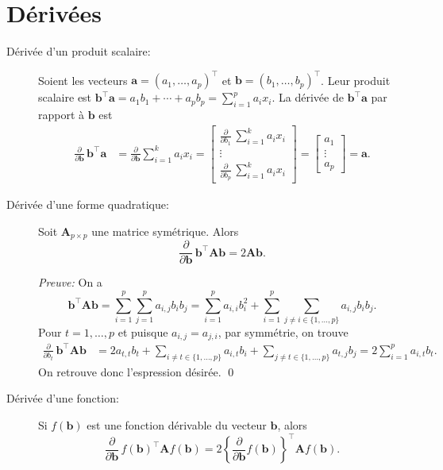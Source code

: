 \section{Dérivées}
\label{sec:elements:derivees}

\begin{description}
\item[Dérivée d'un produit scalaire:] Soient les vecteurs $\mathbf{a} = (a_1, \ldots, a_p)^\top$ et $\mathbf{b} = (b_1, \ldots, b_p)^\top$. Leur produit scalaire est $\mathbf{b^\top a} = a_1 b_1 + \cdots + a_p b_p = \sum_{i=1}^p a_i x_i$. La dérivée de $\mathbf{b^\top a}$ par rapport à $\mathbf{b}$ est
 \begin{align*}
    \frac{\partial}{\partial \mathbf{b}}\, \mathbf{b^\top a}
    &= \frac{\partial}{\partial \mathbf{b}}\sum_{i=1}^k a_i x_i 
    =
    \begin{bmatrix}
      \frac{\partial}{\partial b_1}\, \sum_{i=1}^k a_i x_i \\
      \vdots \\
      \frac{\partial}{\partial b_p}\, \sum_{i=1}^k a_i x_i
    \end{bmatrix} 
    =
    \begin{bmatrix}
      a_1 \\
      \vdots \\
      a_p
    \end{bmatrix} 
    = \mathbf{a}.
  \end{align*}

\item [Dérivée d'une forme quadratique:]  Soit $\mathbf{A}_{p \times p}$ une matrice symétrique. Alors
$$ 
 \frac{\partial}{\partial \mathbf{b}}\, \mathbf{b^\top A b} = 2 \mathbf{A b}.
$$

\emph{Preuve:}  On a
$$
\mathbf{b^\top A b}  = \sum_{i=1}^p \sum_{j=1}^p a_{i,j} b_i b_j 
    = \sum_{i=1}^p a_{i,i} b_i^2 +
       \sum_{i=1}^p \sum_{j \ne i \in \{1,\ldots, p\}} a_{i,j} b_i b_j.
$$
Pour $t = 1, \dots, p$ et puisque $a_{i,j} = a_{j,i}$, par symmétrie, on trouve
  \begin{align*}
    \frac{\partial}{\partial b_t}\, \mathbf{b^\top A b}
    &= 2 a_{t,t} b_t + \sum_{i \ne t \in \{1,\ldots, p\}} a_{i,t} b_i +
       \sum_{j \ne t \in \{1,\ldots, p\}} a_{t,j} b_j = 2 \sum_{i=1}^p a_{i,t} b_t. 
  \end{align*}
On retrouve donc l'espression désirée. \hfill \qed

\item [Dérivée d'une fonction:]  Si $f(\mathbf{b})$ est une fonction dérivable du vecteur $\mathbf{b}$, alors
$$
 \frac{\partial}{\partial \mathbf{b}}\,f(\mathbf{b})^\top \mathbf{A} f(\mathbf{b}) =
   2 \left\{  \frac{\partial}{\partial \mathbf{b}} f(\mathbf{b}) \right\}^\top \mathbf{A} f(\mathbf{b}).
$$

\end{description}

